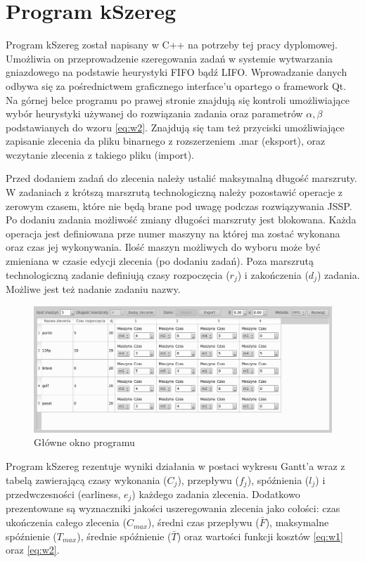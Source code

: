 \documentclass[twoside]{kInzynierka}
\begin{document}
\section        {Program kSzereg}
Program kSzereg został napisany w C++ na potrzeby tej pracy dyplomowej. Umożliwia on przeprowadzenie szeregowania zadań w systemie wytwarzania gniazdowego na podstawie heurystyki FIFO bądź LIFO. Wprowadzanie danych odbywa się za pośrednictwem graficznego interface'u opartego o framework Qt. Na górnej belce programu po prawej stronie znajdują się kontroli umożliwiające wybór heurystyki używanej do rozwiązania zadania oraz parametrów \(\alpha, \beta\) podstawianych do wzoru \eqref{eq:w2}. Znajdują się tam też przyciski umożliwiające zapisanie zlecenia da pliku binarnego z rozszerzeniem .mar (eksport), oraz wczytanie zlecenia z takiego pliku (import). 

Przed dodaniem zadań do zlecenia należy ustalić maksymalną długość marszruty. W zadaniach z krótszą marszrutą technologiczną należy pozostawić operacje z zerowym czasem, które nie będą brane pod uwagę podczas rozwiązywania JSSP. Po dodaniu zadania możliwość zmiany długości marszruty jest blokowana. Każda operacja jest definiowana prze numer maszyny na której ma zostać wykonana oraz czas jej wykonywania. Ilość maszyn możliwych do wyboru może być zmieniana w czasie edycji zlecenia (po dodaniu zadań). Poza marszrutą technologiczną zadanie definiują czasy rozpoczęcia (\(r_j\)) i zakończenia (\(d_j\)) zadania. Możliwe jest też nadanie zadaniu nazwy.

\begin{figure}[htb]
    \centering
    \includegraphics[width=\textwidth, keepaspectratio=true]{./obrazki/main}
    \caption{Główne okno programu}
\end{figure}

Program kSzereg rezentuje wyniki działania w postaci wykresu Gantt'a wraz z tabelą zawierającą czasy wykonania (\(C_j\)), przepływu (\(f_j\)), spóźnienia (\(l_j\)) i przedwczesności (earliness, \(e_j\)) każdego zadania zlecenia. Dodatkowo prezentowane są wyznaczniki jakości uszeregowania zlecenia jako cołości: czas ukończenia całego zlecenia (\(C_{max}\)), średni czas przepływu (\( \bar{F} \)), maksymalne spóźnienie (\(T_{max}\)), średnie spóźnienie (\(\bar{T}\)) oraz wartości funkcji kosztów \eqref{eq:w1} oraz \eqref{eq:w2}.%
\end{document}
